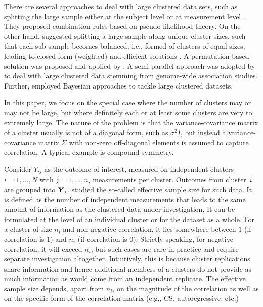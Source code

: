 \documentclass[11pt,a5paper,twoside]{book}
\newcommand{\BY}{\mbox{\boldmath $Y$}}
\begin{document}
There are several approaches to deal with large clustered data sets, such as splitting the large sample either at the subject level or at measurement level \cite{Iddi2011}. They  proposed combination rules based on pseudo-likelihood theory. On the other hand, \cite{hermans2017_cs,hermans2017_ar1} suggested splitting a large sample along unique cluster sizes, such that each sub-sample becomes balanced, i.e., formed of clusters of equal sizes, leading to closed-form (weighted) and efficient solutions \cite{Lisa2015_2}. A permutation-based solution was proposed and applied by \cite{milanzi2014}. A semi-parallel approach was adopted by \cite{sikorska2013,sikorska2013_2} to deal with large clustered data stemming from genome-wide association studies. Further, \cite{otava2014} employed Bayesian approaches to tackle large clustered datasets.

In this paper, we focus on the special case where the number of clusters may or may not be large, but where definitely each or at least some clusters are very to extremely large. The nature of the problem is that the variance-covariance matrix of a cluster usually is not of a diagonal form, such as  $\sigma^2 I$, but instead a variance-covariance matrix $\Sigma$ with non-zero off-diagonal elements is assumed to capture correlation. A typical example is compound-symmetry.
 
Consider $Y_{ij}$ as the outcome of interest, measured on independent clusters $i=1,\ldots,N$ with $j=1,\ldots,n_i$ measurements per cluster. Outcomes from cluster~$i$ are grouped into $\BY_i$. \cite{faes2009} studied the so-called {effective sample size\/} for such data. It is defined as the number of independent measurements that leads to the same amount of information as the clustered data under investigation. It can be formulated at the level of an individual cluster or for the dataset as a whole. For a cluster of size $n_i$ and non-negative correlation, it lies somewhere between $1$ (if correlation is 1) and $n_i$ (if correlation is 0). Strictly speaking, for negative correlation, it will exceed $n_i$, but such cases are rare in practice and require separate investigation altogether. Intuitively, this is because cluster replications share information and hence additional members of a clusters do not provide as much information as would come from an independent replicate. The effective sample size depends, apart from $n_i$, on the magnitude of the correlation as well as on the specific form of the correlation matrix (e.g., CS, autoregressive, etc.)
\end{document}

